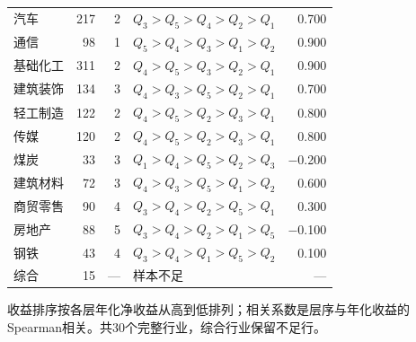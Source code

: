 \begin{longtable}{lrrlr}
汽车 & 217 & 2 & $Q_3>Q_5>Q_4>Q_2>Q_1$ & 0.700 \\
通信 & 98 & 1 & $Q_5>Q_4>Q_3>Q_1>Q_2$ & 0.900 \\
基础化工 & 311 & 2 & $Q_4>Q_5>Q_3>Q_2>Q_1$ & 0.900 \\
建筑装饰 & 134 & 3 & $Q_4>Q_3>Q_5>Q_2>Q_1$ & 0.700 \\
轻工制造 & 122 & 2 & $Q_4>Q_5>Q_2>Q_3>Q_1$ & 0.800 \\
传媒 & 120 & 2 & $Q_4>Q_5>Q_2>Q_3>Q_1$ & 0.800 \\
煤炭 & 33 & 3 & $Q_1>Q_4>Q_5>Q_2>Q_3$ & $-$0.200 \\
建筑材料 & 72 & 3 & $Q_4>Q_3>Q_5>Q_1>Q_2$ & 0.600 \\
商贸零售 & 90 & 4 & $Q_3>Q_4>Q_2>Q_5>Q_1$ & 0.300 \\
房地产 & 88 & 5 & $Q_3>Q_4>Q_2>Q_1>Q_5$ & $-$0.100 \\
钢铁 & 43 & 4 & $Q_3>Q_4>Q_1>Q_5>Q_2$ & 0.100 \\
综合 & 15 & --- & 样本不足 & --- \\
\end{longtable}
\noindent\footnotesize 收益排序按各层年化净收益从高到低排列；相关系数是层序与年化收益的Spearman相关。共30个完整行业，综合行业保留不足行。\par
\endgroup
